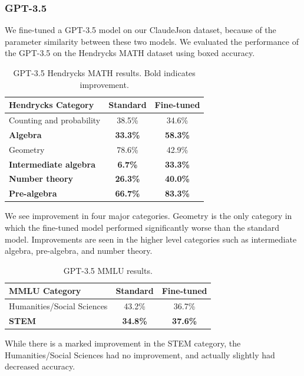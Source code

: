 \subsubsection{GPT-3.5}

We fine-tuned a GPT-3.5 model on our ClaudeJson dataset, because of the parameter similarity between these two models. We evaluated the performance of the GPT-3.5 on the Hendrycks MATH dataset using boxed accuracy.

\begin{table}[h]
\centering
\begin{tabular}{lcc}
\toprule
\textbf{Hendrycks Category} & \textbf{Standard} & \textbf{Fine-tuned} \\
\midrule
Counting and probability & 38.5\% & 34.6\% \\
\textbf{Algebra} & \textbf{33.3\%} & \textbf{58.3\%} \\
Geometry & 78.6\% & 42.9\% \\
\textbf{Intermediate algebra} & \textbf{6.7\%} & \textbf{33.3\%} \\
\textbf{Number theory} & \textbf{26.3\%} & \textbf{40.0\%} \\
\textbf{Pre-algebra} & \textbf{66.7\%} & \textbf{83.3\%} \\
\bottomrule
\end{tabular}
\caption{GPT-3.5 Hendrycks MATH results. Bold indicates improvement.}
\end{table}

We see improvement in four major categories. Geometry is the only category in which the fine-tuned model performed significantly worse than the standard model. Improvements are seen in the higher level categories such as intermediate algebra, pre-algebra, and number theory.

\begin{table}[h]
\centering
\begin{tabular}{lcc}
\toprule
\textbf{MMLU Category} & \textbf{Standard} & \textbf{Fine-tuned} \\
\midrule
Humanities/Social Sciences & 43.2\% & 36.7\% \\
\textbf{STEM} & \textbf{34.8\%} & \textbf{37.6\%} \\
\bottomrule
\end{tabular}
\caption{GPT-3.5 MMLU results.}
\end{table}

While there is a marked improvement in the STEM category, the Humanities/Social Sciences had no improvement, and actually slightly had decreased accuracy.
